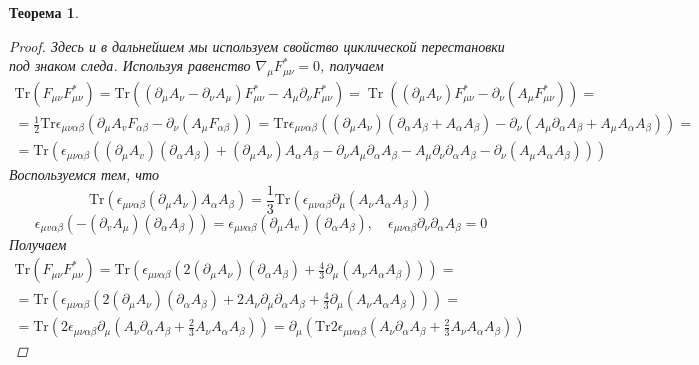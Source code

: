 \documentclass[12pt]{article}
\newtheorem{theorem}{Теорема}[section]
\theoremstyle{definition}
\begin{document}
\begin{theorem}
\begin{proof}
        Здесь и в дальнейшем мы используем свойство циклической перестановки под знаком следа. Используя равенство $\nabla_\mu F_{\mu \nu}^*=0$, получаем
        \begin{multline}
            \text{Tr}\left(F_{\mu\nu} F_{\mu \nu}^*\right)=\text{Tr}(\left(\partial_\mu A_\nu-\partial_\nu A_\mu\right) F_{\mu\nu}^*-A_\mu \partial_\nu F_{\mu \nu}^*)=\operatorname{Tr}((\partial_\mu A_\nu) F_{\mu \nu}^*-\partial_\nu(A_\mu F_{\mu\nu}^*))=\\=\frac{1}{2}\text{Tr} \epsilon_{\mu\nu\alpha\beta}(\partial_\mu A_v F_{\alpha\beta}-\partial_\nu\left(A_\mu F_{\alpha\beta}\right))=\text{Tr}\epsilon_{\mu\nu\alpha\beta}(\left(\partial_\mu A_\nu\right)\left(\partial_\alpha A_\beta+A_\alpha A_\beta\right)-\partial_\nu\left(A_\mu\partial_\alpha A_\beta+A_\mu A_\alpha A_\beta\right))=\\=\text{Tr}(\epsilon_{\mu\nu\alpha\beta}((\partial_\mu A_v)\left(\partial_\alpha A_\beta\right)+(\partial_\mu A_\nu) A_\alpha A_\beta-\partial_\nu A_\mu \partial_\alpha A_\beta-A_\mu \partial_\nu \partial_\alpha A_\beta-\partial_\nu(A_\mu A_\alpha A_\beta)))
        \end{multline}
        Воспользуемся тем, что
        \begin{equation}
            \text{Tr}(\epsilon_{\mu\nu\alpha\beta}\left(\partial_\mu A_\nu\right)A_\alpha A_\beta)=\frac{1}{3}\text{Tr}(\epsilon_{\mu\nu\alpha\beta} \partial_\mu(A_\nu A_\alpha A_\beta))
        \end{equation}
        \begin{equation}
            \epsilon_{\mu v \alpha \beta}(-\left(\partial_v A_\mu\right)\left(\partial_\alpha A_\beta\right))=\epsilon_{\mu \nu \alpha \beta}\left(\partial_\mu A_v\right)\left(\partial_\alpha A_\beta\right),\quad\epsilon_{\mu\nu\alpha\beta}\partial_\nu\partial_\alpha A_\beta=0
        \end{equation}
        Получаем
        \begin{multline}
            \text{Tr}(F_{\mu\nu}F_{\mu\nu}^*)=\text{Tr}\left(\epsilon_{\mu \nu \alpha \beta}\left(2\left(\partial_\mu A_\nu\right)\left(\partial_\alpha A_\beta\right)+\frac{4}{3} \partial_\mu\left(A_\nu A_\alpha A_\beta\right)\right)\right)=\\=\text{Tr}\left(\epsilon_{\mu\nu\alpha\beta}\left(2\left(\partial_\mu A_\nu\right)\left(\partial_\alpha A_\beta\right)+2A_\nu\partial_\mu \partial_\alpha A_\beta+\frac{4}{3} \partial_\mu\left(A_\nu A_\alpha A_\beta\right)\right)\right)=\\=\text{Tr}\left(2\epsilon_{\mu\nu\alpha \beta}\partial_\mu\left(A_\nu \partial_\alpha A_\beta+\frac{2}{3} A_\nu A_\alpha A_\beta\right)\right)=\partial_\mu\left(\text{Tr}2\epsilon_{\mu\nu\alpha \beta}\left(A_\nu\partial_\alpha A_\beta+\frac{2}{3}A_\nu A_\alpha A_\beta\right)\right)

\end{multline}
\end{proof}
\end{theorem}
\end{document}
